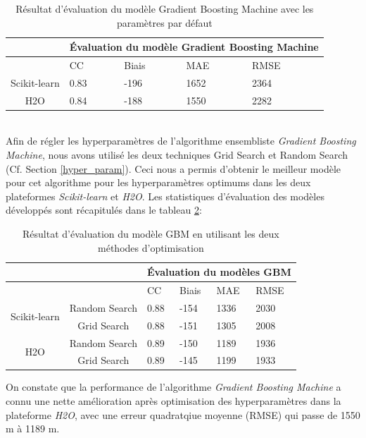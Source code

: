 \begin{table}[!ht]
    \centering
    \begin{tabular}{ |c|p{2cm}|p{2cm}|p{2cm}|p{2cm}|  }
     \hline
     & \multicolumn{4}{|c|}{Évaluation du modèle Gradient Boosting Machine} \\
     \hline
     & CC & Biais & MAE & RMSE\\
     \hline
     Scikit-learn &  0.83 & -196 & 1652 & 2364\\
     \hline
     H2O & 0.84 & -188 & 1550 & 2282 \\
     \hline
    \end{tabular}
    \caption{Résultat d'évaluation du modèle Gradient Boosting Machine avec les paramètres par défaut}
    \label{gbm_default}
\end{table}
\\
Afin de régler les hyperparamètres de l'algorithme ensembliste \textit{Gradient Boosting Machine}, nous avons utilisé les deux techniques Grid Search et Random Search (Cf. Section \ref{hyper_param}). Ceci nous a permis d'obtenir le meilleur modèle pour cet algorithme pour les hyperparamètres optimums dans les deux plateformes \textit{Scikit-learn} et \textit{H2O}. Les statistiques d'évaluation des modèles développés sont récapitulés dans le tableau \ref{gbm_ev_Tuning}:\\

\begin{table}[!ht]
    \centering
    \begin{tabular}{ |c|c|p{1.5cm}|p{1.5cm}|p{2cm}|p{2cm}|  }
     \hline
     \multicolumn{2}{|c|}{} &\multicolumn{4}{|c|}{Évaluation du modèles GBM} \\
     \hline
     \multicolumn{2}{|c|}{} & CC & Biais & MAE & RMSE\\
     \hline
    \multirow{2}{*}{Scikit-learn} &
     Random Search & 0.88 & -154  & 1336 & 2030\\
     & Grid Search & 0.88 & -151 & 1305 & 2008\\
     \hline
     \multirow{2}{*}{H2O} &
     Random Search & 0.89 & -150 & 1189 & 1936\\
     & Grid Search & 0.89 & -145 & 1199 & 1933\\
     \hline
    \end{tabular}
    \caption{Résultat d'évaluation du modèle GBM en utilisant les deux méthodes d'optimisation}
    \label{gbm_ev_Tuning}
\end{table}

 On constate que la performance de l'algorithme \textit{Gradient Boosting Machine} a connu une nette amélioration après optimisation des hyperparamètres dans la plateforme \textit{H2O}, avec une erreur quadratqiue moyenne (RMSE) qui passe de 1550 m à 1189 m.

